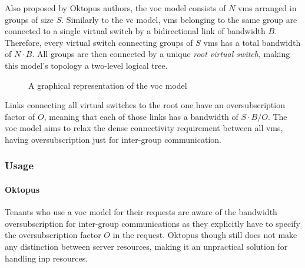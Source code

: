
Also proposed by Oktopus \cite{oktopus} authors, the \gls{voc} model consists of $N$ \glspl{vm} arranged in groups of size $S$.
Similarly to the \gls{vc} model, \glspl{vm} belonging to the same group are connected to a single virtual switch by a bidirectional link of bandwidth $B$.
Therefore, every virtual switch connecting groups of $S$ \glspl{vm} has a total bandwidth of $N \cdot B$.
All groups are then connected by a unique \textit{root virtual switch}, making this model's topology a two-level logical tree.

\begin{figure}[!htb]
    \centering
    \usebox{\vocfigure}
    \caption{A graphical representation of the \gls{voc} model}
\end{figure}

Links connecting all virtual switches to the root one have an oversubscription factor of $O$, meaning that each of those links has a bandwidth of $S \cdot B / O$.
The \gls{voc} model aims to relax the dense connectivity requirement between all \glspl{vm}, having oversubscription just for inter-group communication.

\subsubsection{Usage}
\paragraph{Oktopus \texorpdfstring{\cite{oktopus}}{}}
Tenants who use a \gls{voc} model for their requests are aware of the bandwidth oversubscription for inter-group communications as they explicitly have to specify the oversubscription factor $O$ in the request.
Oktopus \cite{oktopus} though still does not make any distinction between server resources, making it an unpractical solution for handling \gls{inp} resources.